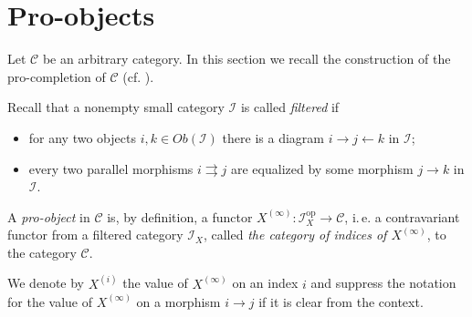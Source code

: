 \documentclass{article}
\newcommand{\rar}{\rightarrow}
\newcommand{\lar}{\leftarrow}
\newcommand{\op}{\mathrm{op}}
\begin{document}
\section{Pro-objects}
Let \(\mathcal C\) be an arbitrary category.
In this section we recall the construction of the pro-completion of \(\mathcal C\) (cf. \cite[Section~6.1]{SK06}).

Recall that a nonempty small category \(\mathcal I\) is called {\it filtered} if
\begin{itemize}
 \item for any two objects \(i, k \in Ob(\mathcal{I})\) there is a diagram \(i \rar j \lar k\) in \(\mathcal I\);
 \item every two parallel morphisms \(i \rightrightarrows j\) are equalized by some morphism \(j \rar k\) in \(\mathcal I\).
\end{itemize}
A {\it pro-object} in \(\mathcal C\) is, by definition, a functor $X^{(\infty)}\colon \mathcal{I}_X^{\op} \to \mathcal{C}$, i.\,e. a contravariant functor from a filtered category \(\mathcal I_X\), called {\it the category of indices of $X^{(\infty)}$}, to the category \(\mathcal C\). %

We denote by \(X^{(i)}\) the value of \(X^{(\infty)}\) on an index \(i\) and suppress the notation for the value of \(X^{(\infty)}\) on a morphism \(i \rar j\) if it is clear from the context.
\end{document}
